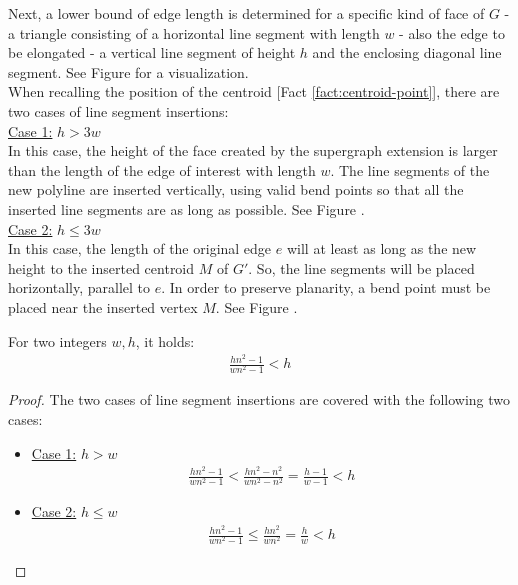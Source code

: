 \bigskip
Next, a lower bound of edge length is determined for a specific kind of face of $G$ - a triangle consisting of a horizontal line segment with length $w$ - also the edge to be elongated - a vertical line segment of height $h$ and the enclosing diagonal line segment. See Figure  for a visualization.\\
When recalling the position of the centroid [Fact \ref{fact:centroid-point}], there are two cases of line segment insertions:\\
\underline{Case 1:} $h > 3w$\\
In this case, the height of the face created by the supergraph extension is larger than the length of the edge of interest with length $w$. The line segments of the new polyline are inserted vertically, using valid bend points so that all the inserted line segments are as long as possible. See Figure .\\
\underline{Case 2:} $h \leq 3w$\\
In this case, the length of the original edge $e$ will at least as long as the new height to the inserted centroid $M$ of $G'$. So, the line segments will be placed horizontally, parallel to $e$. In order to preserve planarity, a bend point must be placed near the inserted vertex $M$. See Figure .
\begin{lemma}
\end{lemma}
For two integers $w,h$, it holds:
\begin{align*}
	\frac{hn^2-1}{wn^2-1}<h
\end{align*}
\begin{proof} The two cases of line segment insertions are covered with the following two cases:
	\begin{itemize}
		\item \underline{Case 1:} $h>w$\\
		\begin{align*}
			\frac{hn^2-1}{wn^2-1} < \frac{hn^2-n^2}{wn^2-n^2} = \frac{h-1}{w-1}< h
		\end{align*}
		\item \underline{Case 2:} $h \leq w$\\
		\begin{align*}
			\frac{hn^2-1}{wn^2-1} \leq \frac{hn^2}{wn^2} = \frac{h}{w} < h
		\end{align*}
	\end{itemize}
\end{proof}
\begin{lemma}
\end{lemma}
